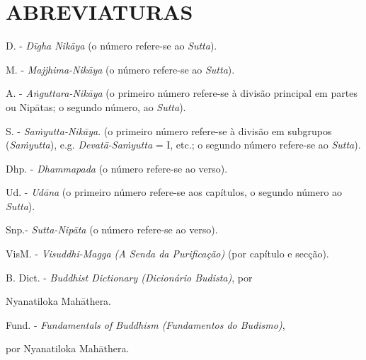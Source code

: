 \chapter{ABREVIATURAS}

D. - \emph{Dīgha Nikāya} (o número refere-se ao \emph{Sutta}).

M. - \emph{Majjhima-Nikāya} (o número refere-se ao \emph{Sutta}).

A. - \emph{Aṅguttara-Nikāya} (o primeiro número refere-se à divisão principal em partes ou Nipātas; o segundo número, ao \emph{Sutta}).

S. - \emph{Saṁyutta-Nikāya}. (o primeiro número refere-se à divisão em subgrupos (\emph{Saṁyutta}), e.g. \emph{Devatā-Saṁyutta} = I, etc.; o segundo número refere-se ao \emph{Sutta}).

Dhp. - \emph{Dhammapada} (o número refere-se ao verso).

Ud. - \emph{Udāna} (o primeiro número refere-se aos capítulos, o segundo número ao \emph{Sutta}).

Snp.- \emph{Sutta-Nipāta} (o número refere-se ao verso).

VisM. - \emph{Visuddhi-Magga (A Senda da Purificação)} (por capítulo e secção).

B. Dict. - \emph{Buddhist Dictionary (Dicionário Budista)}, por

Nyanatiloka Mahāthera.

Fund. - \emph{Fundamentals of Buddhism (Fundamentos do Budismo)},

por Nyanatiloka Mahāthera.

